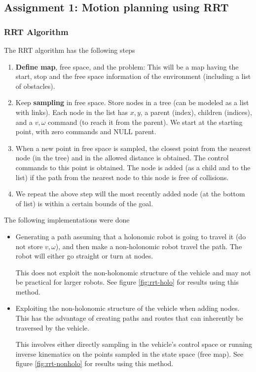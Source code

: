 
\subsection{Assignment 1: Motion planning using RRT}

\subsubsection*{RRT Algorithm}

The RRT algorithm has the following steps

\begin{enumerate}
    \item \textbf{Define map}, free space, and the problem: This will be a map having the start, stop and the free space information of the environment (including a list of obstacles).
    \item Keep \textbf{sampling} in free space. Store nodes in a tree (can be modeled as a list with links). Each node in the list has $x, y$, a parent (index), children (indices), and a $v, \omega$ command (to reach it from the parent). We start at the starting point, with zero commands and NULL parent.
    \item When a new point in free space is sampled, the closest point from the nearest node (in the tree) and in the allowed distance is obtained. The control commands to this point is obtained. The node is added (as a child and to the list) if the path from the nearest node to this node is free of collisions.
    \item We repeat the above step will the most recently added node (at the bottom of list) is within a certain bounds of the goal.
\end{enumerate}

The following implementations were done

\begin{itemize}
    \item Generating a path assuming that a holonomic robot is going to travel it (do not store $v, \omega$), and then make a non-holonomic robot travel the path. The robot will either go straight or turn at nodes.
    
    This does not exploit the non-holonomic structure of the vehicle and may not be practical for larger robots. See figure \ref{fig:rrt-holo} for results using this method.

    \item Exploiting the non-holonomic structure of the vehicle when adding nodes. This has the advantage of creating paths and routes that can inherently be traversed by the vehicle.
    
    This involves either directly sampling in the vehicle's control space or running inverse kinematics on the points sampled in the state space (free map). See figure \ref{fig:rrt-nonholo} for results using this method.
\end{itemize}


